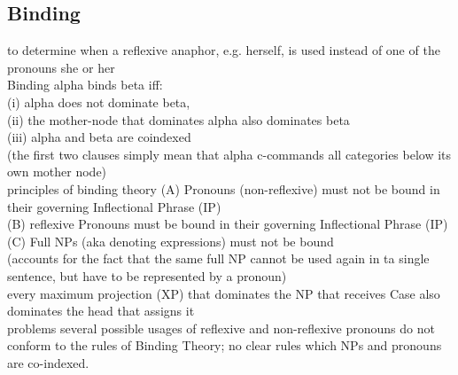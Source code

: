 \subsection*{Binding}
{\tiny to determine when a reflexive anaphor, e.g. herself, is used instead of one of the pronouns she or her}\\
\scriptsize{Binding} {\tiny alpha binds beta iff:\\
(i) alpha does not dominate beta, \\
(ii) the mother-node that dominates alpha also dominates beta \\
(iii) alpha and beta are coindexed\\
(the first two clauses simply mean that alpha c-commands all categories below its own mother node)
}\\
\scriptsize{principles of binding theory} {\tiny (A) Pronouns (non-reflexive) must not be bound in their governing Inflectional Phrase (IP)\\
(B) reflexive Pronouns must be bound in their governing Inflectional Phrase (IP)\\
(C) Full NPs (aka denoting expressions) must not be bound\\
(accounts for the fact that the same full NP cannot be used again in ta single sentence, but have to be represented by a pronoun)\\
every maximum projection (XP) that dominates the NP that receives Case also dominates the head that assigns it
}\\
\scriptsize{problems} {\tiny several possible usages of reflexive and non-reflexive
pronouns do not conform to the rules of Binding Theory; no clear rules which NPs and pronouns are co-indexed.}
